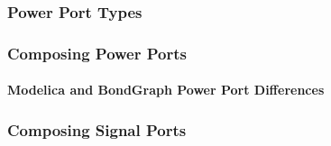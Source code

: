 
\subsubsection{Power Port Types}

\subsubsection{Composing Power Ports}

\paragraph{Modelica and BondGraph Power Port Differences}

\subsubsection{Composing Signal Ports}